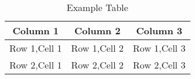 \documentclass{article}
\begin{document}
	\begin{table}[h]
		\centering
		\begin{tabular}{|c|c|c|}
			\hline
			\textbf{Column 1} & \textbf{Column 2} & \textbf{Column 3}\\
			\hline
			Row 1,Cell 1 & Row 1,Cell 2 & Row 1,Cell 3\\
			\hline
			Row 2,Cell 1 & Row 2,Cell 2 & Row 2,Cell 3\\
			\hline
		\end{tabular}
	\caption{Example Table}
	\label{tab:example}
		\end{table}
\end{document}
